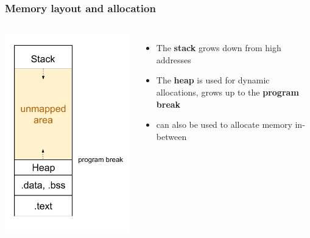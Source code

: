 
\begin{frame}
	\frametitle{Memory layout and allocation}
	\begin{columns}
    \includegraphics[width=\textwidth]{slides/realtime-linux-application-development/process_memory.pdf}
			\begin{itemize}
				\item The \textbf{stack} grows down from high addresses
				\item The \textbf{heap} is used for dynamic allocations, grows up to the \textbf{program break}
				\item {} can also be used to allocate memory in-between

\end{itemize}
\end{columns}
\end{frame}
